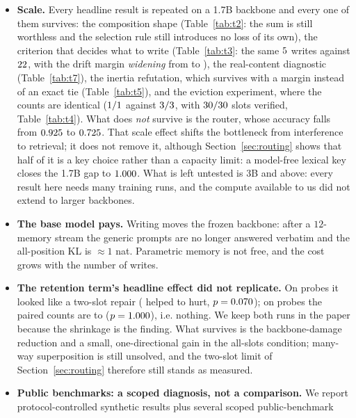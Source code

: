 \documentclass[11pt]{article}
\begin{document}
\begin{itemize}\itemsep2pt
\item \textbf{Scale.} Every headline result is repeated on a 1.7B
  backbone and every one of them survives: the composition shape (Table~\ref{tab:t2}: the sum is
  still worthless and the selection rule still introduces no loss of its own), the
  criterion that decides what to write (Table~\ref{tab:t3}: the same
  $5$ writes against $22$, with the drift margin
  \emph{widening} from \tSelfKlRatio{} to \tLargeKlRatio{}), the
  real-content diagnostic (Table~\ref{tab:t7}), the inertia refutation, which survives
  with a margin instead of an exact tie (Table~\ref{tab:t5}), and the eviction experiment,
  where the counts are identical ($1/1$ against $3/3$, with
  $30/30$ slots verified, Table~\ref{tab:t4}). What does \emph{not} survive is the
  router, whose accuracy falls from $0.925{}$ to $0.725{}$. That scale effect shifts the bottleneck from interference to retrieval; it does not remove it, although Section~\ref{sec:routing} shows that half of it is a key choice rather than a capacity limit: a model-free lexical key closes the 1.7B gap to $1.000{}$.
  What is left untested is 3B and above: every result here needs many training runs, and
  the compute available to us did not extend to larger backbones.
\item \textbf{The base model pays.} Writing moves the frozen backbone: after a
  $12$-memory stream the generic prompts are no longer answered verbatim and the
  all-position KL is $\approx 1$ nat. Parametric memory is not free, and the cost
  grows with the number of writes.
\item \textbf{The retention term's headline effect did not replicate.} On
  \tRetentionSmallProbes{} probes it looked like a two-slot repair
  (\tRetentionSmallHelped{} helped to \tRetentionSmallHurt{} hurt,
  $p = 0.070{}$); on \tRetentionProbes{} probes the paired counts are
  \tRetentionHelped{} to \tRetentionHurt{} ($p = 1.000{}$), i.e. nothing. We
  keep both runs in the paper because the shrinkage is the finding. What survives is
  the backbone-damage reduction and a small, one-directional gain in the all-slots
  condition; many-way superposition is still unsolved, and the two-slot limit of
  Section~\ref{sec:routing} therefore still stands as measured.
\item \textbf{Public benchmarks: a scoped diagnosis, not a comparison.} We report
  protocol-controlled synthetic results plus several scoped public-benchmark

\end{itemize}
\end{document}
